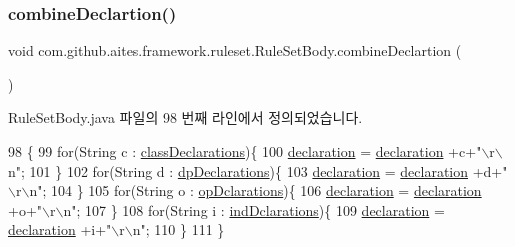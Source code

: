 \subsubsection{\texorpdfstring{combine\+Declartion()}{combineDeclartion()}}
{\footnotesize\ttfamily void com.\+github.\+aites.\+framework.\+ruleset.\+Rule\+Set\+Body.\+combine\+Declartion (\begin{DoxyParamCaption}{ }\end{DoxyParamCaption})\hspace{0.3cm}{\ttfamily [private]}}



Rule\+Set\+Body.\+java 파일의 98 번째 라인에서 정의되었습니다.


\begin{DoxyCode}
98                                     \{
99         \textcolor{keywordflow}{for}(String c : \mbox{\hyperlink{classcom_1_1github_1_1aites_1_1framework_1_1ruleset_1_1_rule_set_body_a01a0ea947278595b1ebd1b13a5d1c7cd}{classDeclarations}})\{
100             \mbox{\hyperlink{classcom_1_1github_1_1aites_1_1framework_1_1ruleset_1_1_rule_set_body_a2cf57d61b47b322bf4e866cb15c4a7e3}{declaration}} = \mbox{\hyperlink{classcom_1_1github_1_1aites_1_1framework_1_1ruleset_1_1_rule_set_body_a2cf57d61b47b322bf4e866cb15c4a7e3}{declaration}} +c+\textcolor{stringliteral}{"\(\backslash\)r\(\backslash\)n"};
101         \}
102         \textcolor{keywordflow}{for}(String d : \mbox{\hyperlink{classcom_1_1github_1_1aites_1_1framework_1_1ruleset_1_1_rule_set_body_a04dba43584689b29c9da9a357effe069}{dpDeclarations}})\{
103             \mbox{\hyperlink{classcom_1_1github_1_1aites_1_1framework_1_1ruleset_1_1_rule_set_body_a2cf57d61b47b322bf4e866cb15c4a7e3}{declaration}} = \mbox{\hyperlink{classcom_1_1github_1_1aites_1_1framework_1_1ruleset_1_1_rule_set_body_a2cf57d61b47b322bf4e866cb15c4a7e3}{declaration}} +d+\textcolor{stringliteral}{"\(\backslash\)r\(\backslash\)n"};
104         \}
105         \textcolor{keywordflow}{for}(String o : \mbox{\hyperlink{classcom_1_1github_1_1aites_1_1framework_1_1ruleset_1_1_rule_set_body_af528c6344f8e8c5b070a93bf12c440b4}{opDclarations}})\{
106             \mbox{\hyperlink{classcom_1_1github_1_1aites_1_1framework_1_1ruleset_1_1_rule_set_body_a2cf57d61b47b322bf4e866cb15c4a7e3}{declaration}} = \mbox{\hyperlink{classcom_1_1github_1_1aites_1_1framework_1_1ruleset_1_1_rule_set_body_a2cf57d61b47b322bf4e866cb15c4a7e3}{declaration}} +o+\textcolor{stringliteral}{"\(\backslash\)r\(\backslash\)n"};
107         \}
108         \textcolor{keywordflow}{for}(String i : \mbox{\hyperlink{classcom_1_1github_1_1aites_1_1framework_1_1ruleset_1_1_rule_set_body_ac25f4ee84e59e4ebfc47452c84ead7c6}{indDclarations}})\{
109             \mbox{\hyperlink{classcom_1_1github_1_1aites_1_1framework_1_1ruleset_1_1_rule_set_body_a2cf57d61b47b322bf4e866cb15c4a7e3}{declaration}} = \mbox{\hyperlink{classcom_1_1github_1_1aites_1_1framework_1_1ruleset_1_1_rule_set_body_a2cf57d61b47b322bf4e866cb15c4a7e3}{declaration}} +i+\textcolor{stringliteral}{"\(\backslash\)r\(\backslash\)n"};
110         \}
111     \}
\end{DoxyCode}

